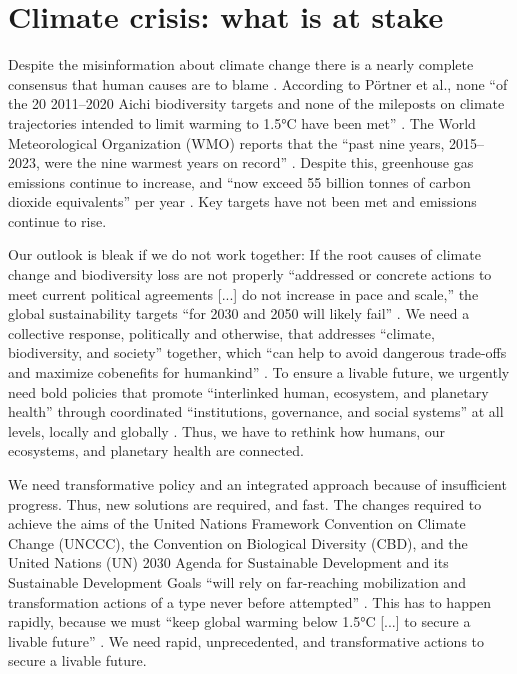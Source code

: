 \section{Climate crisis: what is at stake}
Despite the misinformation about climate change there is a nearly complete consensus that human causes are to blame \citep{Cook_2016,lynas_greater_2021}. According to Pörtner et al., none “of the 20 2011–2020 Aichi biodiversity targets and none of the mileposts on climate trajectories intended to limit warming to 1.5°C have been met” \citep[p. 1]{portner_overcoming_2023}. The World Meteorological Organization (WMO) reports that the “past nine years, 2015–2023, were the nine warmest years on record” \citep[p. 3]{world_meteorological_organization_state_2024}. Despite this, greenhouse gas emissions continue to increase, and “now exceed 55 billion tonnes of carbon dioxide equivalents” per year \citep[p. 1]{portner_overcoming_2023}. Key targets have not been met and emissions continue to rise.

Our outlook is bleak if we do not work together: If the root causes of climate change and biodiversity loss are not properly “addressed or concrete actions to meet current political agreements [...] do not increase in pace and scale,” the global sustainability targets “for 2030 and 2050 will likely fail” \citep[p. 1]{portner_overcoming_2023}. We need a collective response, politically and otherwise, that addresses “climate, biodiversity, and society” together, which “can help to avoid dangerous trade-offs and maximize cobenefits for humankind” \citep[p. 1]{portner_overcoming_2023}. To ensure a livable future, we urgently need bold policies that promote “interlinked human, ecosystem, and planetary health” through coordinated “institutions, governance, and social systems” at all levels, locally and globally \citep[p. 1]{portner_overcoming_2023}. Thus, we have to rethink how humans, our ecosystems, and planetary health are connected. 

We need transformative policy and an integrated approach because of insufficient progress. Thus, new solutions are required, and fast. The changes required to achieve the aims of the United Nations Framework Convention on Climate Change (UNCCC), the Convention on Biological Diversity (CBD), and the United Nations (UN) 2030 Agenda for Sustainable Development and its Sustainable Development Goals “will rely on far-reaching mobilization and transformation actions of a type never before attempted” \citep[p. 8]{portner_overcoming_2023}. This has to happen rapidly, because we must “keep global warming below 1.5°C [...] to secure a livable future” \citep[p. 8]{portner_overcoming_2023}. We need rapid, unprecedented, and transformative actions to secure a livable future.

